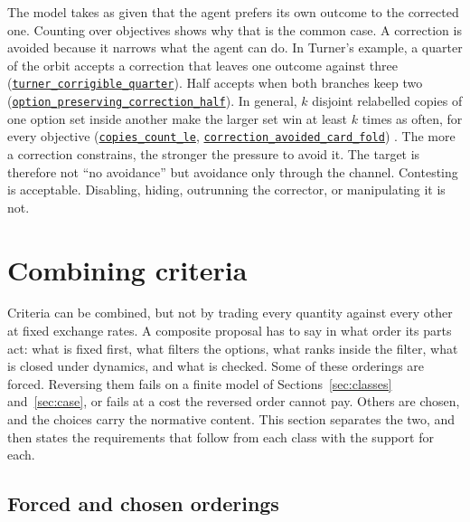 \documentclass[11pt]{article}
\newcommand{\lean}[1]{\hyperref[lean:#1]{\nolinkurl{#1}}}
\begin{document}
The model takes as given that the agent prefers its own outcome to the corrected one.
Counting over objectives shows why that is the common case.
A correction is avoided because it narrows what the agent can do.
In Turner's example, a quarter of the orbit accepts a correction that leaves one outcome against three (\lean{turner_corrigible_quarter}).
Half accepts when both branches keep two (\lean{option_preserving_correction_half}).
In general, $k$ disjoint relabelled copies of one option set inside another make the larger set win at least $k$ times as often, for every objective (\lean{copies_count_le}, \lean{correction_avoided_card_fold}) \parencite{turner2022retargetable}.
The more a correction constrains, the stronger the pressure to avoid it.
The target is therefore not ``no avoidance'' but avoidance only through the channel.
Contesting is acceptable.
Disabling, hiding, outrunning the corrector, or manipulating it is not.

\section{Combining criteria}
\label{sec:composition}

Criteria can be combined, but not by trading every quantity against every other at fixed exchange rates.
A composite proposal has to say in what order its parts act: what is fixed first, what filters the options, what ranks inside the filter, what is closed under dynamics, and what is checked.
Some of these orderings are forced.
Reversing them fails on a finite model of Sections~\ref{sec:classes} and~\ref{sec:case}, or fails at a cost the reversed order cannot pay.
Others are chosen, and the choices carry the normative content.
This section separates the two, and then states the requirements that follow from each class with the support for each.

\subsection{Forced and chosen orderings}
\label{sec:order}
\end{document}
